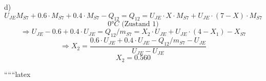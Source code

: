 d)
\[
U_{JE} M_{S7} + 0.6 \cdot M_{S7} + 0.4 \cdot M_{S7} - Q_{12} = Q_{12} = U_{JE} \cdot X \cdot M_{S7} + U_{JE} \cdot (7 - X) \cdot M_{S7}
\]
\[
0°C \text{ (Zustand 1)}
\]
\[
\Rightarrow U_{JE} - 0.6 + 0.4 \cdot U_{JE} = Q_{12} / m_{S7} = X_2 \cdot U_{JE} + U_{JE} \cdot (4 - X_1) - X_{S7}
\]
\[
\Rightarrow X_2 = \frac{0.6 \cdot U_{JE} + 0.4 \cdot U_{JE} - Q_{12} / m_{S7} - U_{JE}}{U_{JE} - U_{JE}}
\]
\[
X_2 = 0.560
\]

``````latex